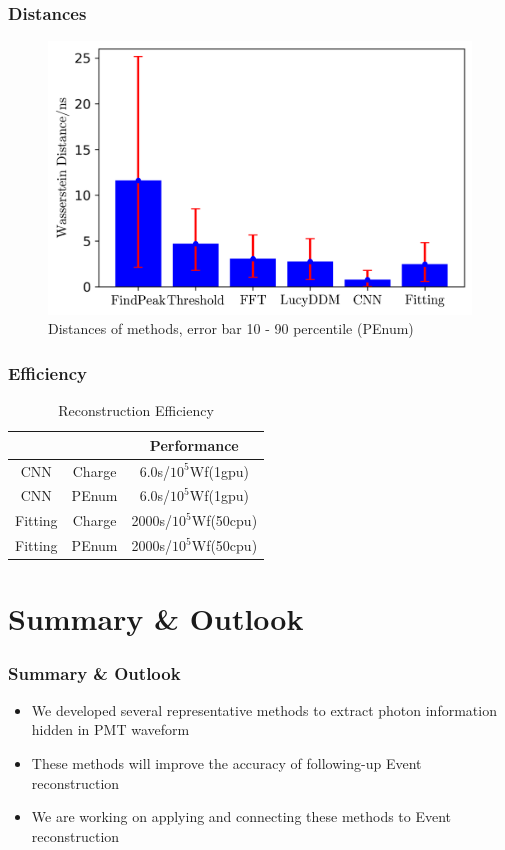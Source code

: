 \documentclass{beamer}
\begin{document}
\begin{frame}
\frametitle{Distances}
\begin{figure}
    \centering
    \caption{Distances of methods, error bar 10 - 90 percentile (PEnum)}
    \includegraphics[width=1.0\linewidth]{img/summarypenum.png}
\end{figure}
\end{frame}

\begin{frame}
\frametitle{Efficiency}
\begin{table}
    \centering
    \caption{Reconstruction Efficiency}
    \begin{tabular}{c|c|c}
        \hline
        &  & Performance \\
        \hline
        CNN & Charge & 6.0s/$10^{5}$Wf(1gpu) \\
        \hline
        CNN & PEnum & 6.0s/$10^{5}$Wf(1gpu)\\
        \hline
        Fitting & Charge & 2000s/$10^{5}$Wf(50cpu) \\
        \hline
        Fitting & PEnum & 2000s/$10^{5}$Wf(50cpu) \\
        \hline
    \end{tabular}
\end{table}
\end{frame}

\section{Summary \& Outlook}
\begin{frame}
\frametitle{Summary \& Outlook}
\begin{itemize}
    \item We developed several representative methods to extract photon information hidden in PMT waveform
    \item These methods will improve the accuracy of following-up Event reconstruction
    \item We are working on applying and connecting these methods to Event reconstruction
\end{itemize}
\end{frame}
\end{document}
